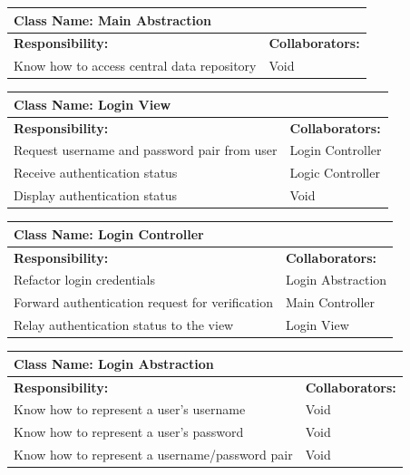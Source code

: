 \documentclass[]{article}
\begin{document}
	\begin{table}[H]
	\centering
		\begin{tabular}{|p{9cm}|p{3cm}|}
		\hline
		 \multicolumn{2}{|l|}{\textbf{Class Name: Main Abstraction}} \\
		\hline
		\textbf{Responsibility:} & \textbf{Collaborators:} \\
		\hline
		Know how to access central data repository & Void\\
		\hline
		\end{tabular}
	\end{table}
	
	\begin{table}[H]
	\centering
		\begin{tabular}{|p{9cm}|p{3cm}|}
		\hline
		 \multicolumn{2}{|l|}{\textbf{Class Name: Login View}} \\
		\hline
		\textbf{Responsibility:} & \textbf{Collaborators:} \\
		\hline
		Request username and password pair from user & Login Controller\\
		\hline
		Receive authentication status & Logic Controller\\
		\hline
		Display authentication status & Void\\
		\hline
		\end{tabular}
	\end{table}
	
	\begin{table}[H]
	\centering
		\begin{tabular}{|p{9cm}|p{3cm}|}
		\hline
		 \multicolumn{2}{|l|}{\textbf{Class Name: Login Controller}} \\
		\hline
		\textbf{Responsibility:} & \textbf{Collaborators:} \\
		\hline
	    Refactor login credentials & Login Abstraction\\
		\hline
		Forward authentication request for verification & Main Controller\\
		\hline
		Relay authentication status to the view & Login View\\
		\hline
		\end{tabular}
	\end{table}
	
	\begin{table}[H]
	\centering
		\begin{tabular}{|p{9cm}|p{3cm}|}
		\hline
		 \multicolumn{2}{|l|}{\textbf{Class Name: Login Abstraction}} \\
		\hline
		\textbf{Responsibility:} & \textbf{Collaborators:} \\
		\hline
	    Know how to represent a user's username & Void\\
		\hline
		Know how to represent a user's password & Void\\
		\hline
		Know how to represent a username/password pair & Void\\
		\hline
		\end{tabular}
	\end{table}
	
\end{document}

